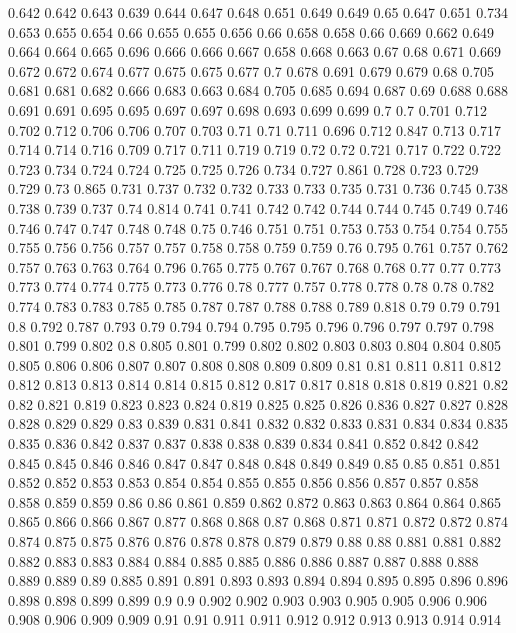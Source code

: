 0.642 0.642
0.643 0.639
0.644 0.647
0.648 0.651
0.649 0.649
0.65 0.647
0.651 0.734
0.653 0.655
0.654 0.66
0.655 0.655
0.656 0.66
0.658 0.658
0.66 0.669
0.662 0.649
0.664 0.664
0.665 0.696
0.666 0.666
0.667 0.658
0.668 0.663
0.67 0.68
0.671 0.669
0.672 0.672
0.674 0.677
0.675 0.675
0.677 0.7
0.678 0.691
0.679 0.679
0.68 0.705
0.681 0.681
0.682 0.666
0.683 0.663
0.684 0.705
0.685 0.694
0.687 0.69
0.688 0.688
0.691 0.691
0.695 0.695
0.697 0.697
0.698 0.693
0.699 0.699
0.7 0.7
0.701 0.712
0.702 0.712
0.706 0.706
0.707 0.703
0.71 0.71
0.711 0.696
0.712 0.847
0.713 0.717
0.714 0.714
0.716 0.709
0.717 0.711
0.719 0.719
0.72 0.72
0.721 0.717
0.722 0.722
0.723 0.734
0.724 0.724
0.725 0.725
0.726 0.734
0.727 0.861
0.728 0.723
0.729 0.729
0.73 0.865
0.731 0.737
0.732 0.732
0.733 0.733
0.735 0.731
0.736 0.745
0.738 0.738
0.739 0.737
0.74 0.814
0.741 0.741
0.742 0.742
0.744 0.744
0.745 0.749
0.746 0.746
0.747 0.747
0.748 0.748
0.75 0.746
0.751 0.751
0.753 0.753
0.754 0.754
0.755 0.755
0.756 0.756
0.757 0.757
0.758 0.758
0.759 0.759
0.76 0.795
0.761 0.757
0.762 0.757
0.763 0.763
0.764 0.796
0.765 0.775
0.767 0.767
0.768 0.768
0.77 0.77
0.773 0.773
0.774 0.774
0.775 0.773
0.776 0.78
0.777 0.757
0.778 0.778
0.78 0.78
0.782 0.774
0.783 0.783
0.785 0.785
0.787 0.787
0.788 0.788
0.789 0.818
0.79 0.79
0.791 0.8
0.792 0.787
0.793 0.79
0.794 0.794
0.795 0.795
0.796 0.796
0.797 0.797
0.798 0.801
0.799 0.802
0.8 0.805
0.801 0.799
0.802 0.802
0.803 0.803
0.804 0.804
0.805 0.805
0.806 0.806
0.807 0.807
0.808 0.808
0.809 0.809
0.81 0.81
0.811 0.811
0.812 0.812
0.813 0.813
0.814 0.814
0.815 0.812
0.817 0.817
0.818 0.818
0.819 0.821
0.82 0.82
0.821 0.819
0.823 0.823
0.824 0.819
0.825 0.825
0.826 0.836
0.827 0.827
0.828 0.828
0.829 0.829
0.83 0.839
0.831 0.841
0.832 0.832
0.833 0.831
0.834 0.834
0.835 0.835
0.836 0.842
0.837 0.837
0.838 0.838
0.839 0.834
0.841 0.852
0.842 0.842
0.845 0.845
0.846 0.846
0.847 0.847
0.848 0.848
0.849 0.849
0.85 0.85
0.851 0.851
0.852 0.852
0.853 0.853
0.854 0.854
0.855 0.855
0.856 0.856
0.857 0.857
0.858 0.858
0.859 0.859
0.86 0.86
0.861 0.859
0.862 0.872
0.863 0.863
0.864 0.864
0.865 0.865
0.866 0.866
0.867 0.877
0.868 0.868
0.87 0.868
0.871 0.871
0.872 0.872
0.874 0.874
0.875 0.875
0.876 0.876
0.878 0.878
0.879 0.879
0.88 0.88
0.881 0.881
0.882 0.882
0.883 0.883
0.884 0.884
0.885 0.885
0.886 0.886
0.887 0.887
0.888 0.888
0.889 0.889
0.89 0.885
0.891 0.891
0.893 0.893
0.894 0.894
0.895 0.895
0.896 0.896
0.898 0.898
0.899 0.899
0.9 0.9
0.902 0.902
0.903 0.903
0.905 0.905
0.906 0.906
0.908 0.906
0.909 0.909
0.91 0.91
0.911 0.911
0.912 0.912
0.913 0.913
0.914 0.914
